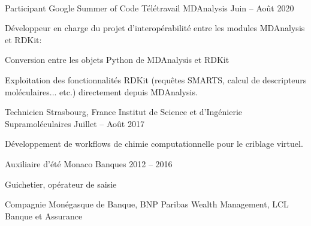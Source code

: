 %
\begin{minipage}[t]{.02\linewidth}\vspace{0pt}
     \ 
\end{minipage}\nobreak
% 
\begin{minipage}[t]{.49\linewidth}\vspace{0pt}
% 
    \begin{cventries}
% 
        \cventryvar
            {Participant Google Summer of Code}
            {Télétravail}
            {MDAnalysis}
            {Juin -- Août 2020}
            {
            \vspace{-1.2\baselineskip}
            Développeur en charge du projet d'interopérabilité entre les modules MDAnalysis et RDKit: \vspace{1.2\baselineskip}
            \begin{cvitems}
                \item{Conversion entre les objets Python de MDAnalysis et RDKit}
                \item{Exploitation des fonctionnalités RDKit (requêtes SMARTS, calcul de descripteurs moléculaires... etc.) directement depuis MDAnalysis.}
            \end{cvitems}
            \vspace{1em}
            }
% 
        \cventryvar
            {Technicien}
            {Strasbourg, France}
            {Institut de Science et d'Ingénierie Supramoléculaires}
            {Juillet -- Août 2017}
            {
            \begin{cvitems}
                \item{Développement de workflows de chimie computationnelle pour le criblage virtuel.}
            \end{cvitems}
            \vspace{1em}
            }
% 
        \cventryvar
            {Auxiliaire d'été}
            {Monaco}
            {Banques}
            {2012 -- 2016}
            {
            \begin{cvitems}
                \item{Guichetier, opérateur de saisie}
                \item{Compagnie Monégasque de Banque, BNP Paribas Wealth \mbox{Management}, LCL Banque et Assurance}
            \end{cvitems}
            \vspace{1em}
            }
% 
    \end{cventries}
% 
\end{minipage}%